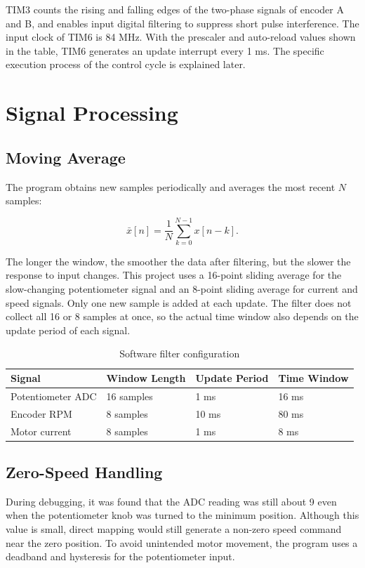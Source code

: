 \documentclass[12pt, a4paper]{report}
\begin{document}
TIM3 counts the rising and falling edges of the two-phase signals of encoder A and B, and enables input digital filtering to suppress short pulse interference. The input clock of TIM6 is 84 MHz. With the prescaler and auto-reload values shown in the table, TIM6 generates an update interrupt every 1 ms. The specific execution process of the control cycle is explained later.


\section{Signal Processing}


\subsection{Moving Average}

The program obtains new samples periodically and averages the most recent \(N\) samples:

\[
\bar{x}[n]=\frac{1}{N}\sum_{k=0}^{N-1}x[n-k].
\]

The longer the window, the smoother the data after filtering, but the slower the response to input changes. This project uses a 16-point sliding average for the slow-changing potentiometer signal and an 8-point sliding average for current and speed signals. Only one new sample is added at each update. The filter does not collect all 16 or 8 samples at once, so the actual time window also depends on the update period of each signal.
\begin{table}[H]
\centering
\caption{Software filter configuration}
\small
\begin{tabular}{@{}p{}p{}p{}p{}@{}}
\toprule
Signal & Window Length & Update Period & Time Window \\
\midrule
Potentiometer ADC & 16 samples & 1 ms & 16 ms \\
Encoder RPM & 8 samples & 10 ms & 80 ms \\
Motor current & 8 samples & 1 ms & 8 ms \\
\bottomrule
\end{tabular}
\end{table}


\subsection{Zero-Speed Handling}

During debugging, it was found that the ADC reading was still about 9 even when the potentiometer knob was turned to the minimum position. Although this value is small, direct mapping would still generate a non-zero speed command near the zero position. To avoid unintended motor movement, the program uses a deadband and hysteresis for the potentiometer input.
\end{document}
